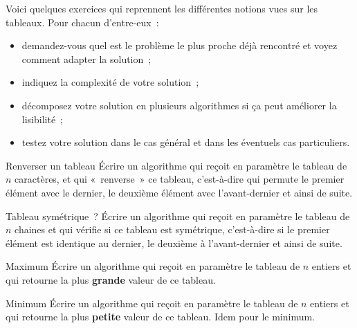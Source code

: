 
	Voici quelques exercices
	qui reprennent les différentes notions vues sur les tableaux.
	Pour chacun d’entre-eux~:
	\begin{itemize}
	\item
		demandez-vous quel est le problème le plus proche déjà
		rencontré et voyez comment adapter la solution~;
	\item
		indiquez la complexité de votre solution~;
	\item
		décomposez votre solution en plusieurs algorithmes 
		si ça peut améliorer la lisibilité~;
	\item
		testez votre solution dans le cas général
		et dans les éventuels cas particuliers.
	\end{itemize}
	
	\begin{Exercice}{Renverser un tableau}
		Écrire un algorithme qui reçoit en paramètre 
		le tableau  de $n$ caractères, 
		et qui «~renverse~» ce tableau, 
		c’est-à-dire qui permute le premier élément avec le dernier, 
		le deuxième élément avec l’avant-dernier et ainsi de suite.
	\end{Exercice}
	
	\begin{Exercice}{Tableau symétrique~?}
		Écrire un algorithme qui reçoit en paramètre 
		le tableau  de $n$ chaines 
		et qui vérifie si ce tableau est symétrique, 
		c’est-à-dire si le premier élément est identique au dernier, 
		le deuxième à l’avant-dernier et ainsi de suite.
	\end{Exercice}
		
	\begin{Exercice}{Maximum}
		Écrire un algorithme qui reçoit en paramètre le tableau
		 de $n$ entiers et qui
		retourne la plus \textbf{grande} valeur de ce tableau.
	\end{Exercice}
		
	\begin{Exercice}{Minimum}
		Écrire un algorithme qui reçoit en paramètre le tableau
		 de $n$ entiers et qui
		retourne la plus \textbf{petite} valeur de ce tableau. Idem pour le minimum.
	\end{Exercice}
	
